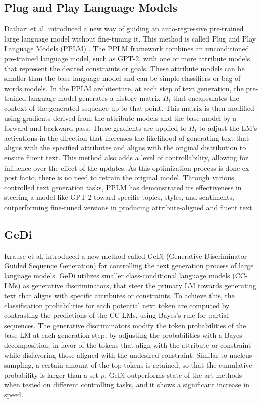 \subsection{Plug and Play Language Models}
Dathari et al. introduced a new way of guiding an auto-regressive pre-trained large language model without fine-tuning it. This method is called Plug and Play Language Models (PPLM) \cite{dathathri_plug_2020}. The PPLM framework combines an unconditioned pre-trained language model, such as GPT-2, with one or more attribute models that represent the desired constraints or goals. These attribute models can be smaller than the base language model and can be simple classifiers or bag-of-words models.  In the PPLM architecture, at each step of text generation, the pre-trained language model generates a history matrix \(H_{t}\) that encapsulates the context of the generated sequence up to that point. This matrix is then modified using gradients derived from the attribute models and the base model by a forward and backward pass. These gradients are applied to \(H_{t}\) to adjust the LM's activations in the direction that increases the likelihood of generating text that aligns with the specified attributes and aligns with the original distribution to ensure fluent text. This method also adds a level of controllability, allowing for influence over the effect of the updates. As this optimization process is done ex post facto, there is no need to retrain the original model. Through various controlled text generation tasks, PPLM has demonstrated its effectiveness in steering a model like GPT-2 toward specific topics, styles, and sentiments, outperforming fine-tuned versions in producing attribute-aligned and fluent text.


\subsection{GeDi}
Krause et al. introduced a new method called GeDi (Generative Discriminator Guided Sequence Generation) \cite{krause_gedi_2020} for controlling the text generation process of large language models. GeDi utilizes smaller class-conditional language models (CC-LMs) as generative discriminators, that steer the primary LM towards generating text that aligns with specific attributes or constraints.  To achieve this, the classification probabilities for each potential next token are computed by contrasting the predictions of the CC-LMs, using Bayes's rule for partial sequences. The generative discriminators modify the token probabilities of the base LM at each generation step, by adjusting the probabilities with a Bayes decomposition, in favor of the tokens that align with the attribute or constraint while disfavoring those aligned with the undesired constraint. Similar to nucleus sampling, a certain amount of the top-tokens is retained, so that the cumulative probability is larger than a set \(\rho\). GeDi outperforms state-of-the-art methods when tested on different controlling tasks, and it shows a significant increase in speed.

